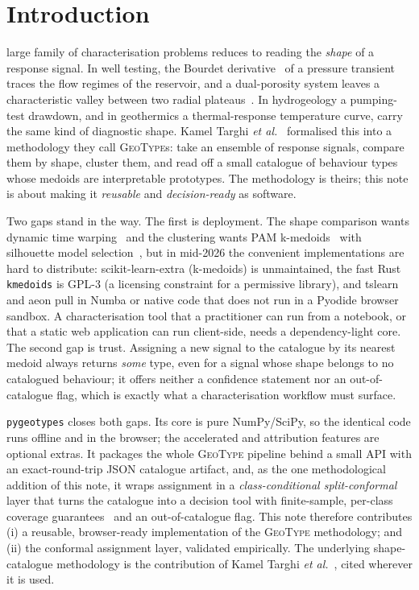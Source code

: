 \documentclass[journal]{IEEEtran}
\newcommand{\gt}{\textsc{GeoType}}
\begin{document}
\section{Introduction}

 large family of characterisation problems reduces to reading the \emph{shape} of a response
signal. In well testing, the Bourdet derivative~\cite{bourdet} of a pressure transient traces the flow regimes
of the reservoir, and a dual-porosity system leaves a characteristic valley between two radial
plateaus~\cite{warren}. In hydrogeology a pumping-test drawdown, and in geothermics a thermal-response
temperature curve, carry the same kind of diagnostic shape. Kamel Targhi \emph{et al.}~\cite{geotypes} formalised
this into a methodology they call \gt{}s: take an ensemble of response signals, compare them by shape, cluster
them, and read off a small catalogue of behaviour types whose medoids are interpretable prototypes. The
methodology is theirs; this note is about making it \emph{reusable} and \emph{decision-ready} as software.

Two gaps stand in the way. The first is deployment. The shape comparison wants dynamic time
warping~\cite{sakoe} and the clustering wants PAM k-medoids~\cite{kaufman} with silhouette model
selection~\cite{rousseeuw}, but in mid-2026 the convenient implementations are hard to distribute: scikit-learn-extra
(k-medoids) is unmaintained, the fast Rust \texttt{kmedoids} is GPL-3 (a licensing constraint for a permissive
library), and tslearn and aeon pull in Numba or native code that does not run in a Pyodide browser sandbox. A
characterisation tool that a practitioner can run from a notebook, or that a static web application can run
client-side, needs a dependency-light core. The second gap is trust. Assigning a new signal to the catalogue by
its nearest medoid always returns \emph{some} type, even for a signal whose shape belongs to no catalogued
behaviour; it offers neither a confidence statement nor an out-of-catalogue flag, which is exactly what a
characterisation workflow must surface.

\texttt{pygeotypes} closes both gaps. Its core is pure NumPy/SciPy, so the identical code runs offline and in the
browser; the accelerated and attribution features are optional extras. It packages the whole \gt{} pipeline
behind a small API with an exact-round-trip JSON catalogue artifact, and, as the one methodological addition of
this note, it wraps assignment in a \emph{class-conditional split-conformal} layer that turns the catalogue into a
decision tool with finite-sample, per-class coverage guarantees~\cite{vovk,angelopoulos} and an
out-of-catalogue flag. This note therefore contributes (i) a reusable, browser-ready implementation of the \gt{}
methodology; and (ii) the conformal assignment layer, validated empirically. The underlying shape-catalogue
methodology is the contribution of Kamel Targhi \emph{et al.}~\cite{geotypes}, cited wherever it is used.
\end{document}
